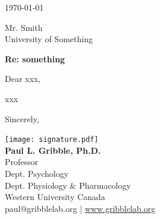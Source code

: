 \documentclass[11pt]{article}
\begin{document}
\thispagestyle{fancy}

\today
\vspace{2.0ex}

Mr. Smith\\  				%
University of Something

\vspace{2.5ex}

\textbf{Re: something}		%
\vspace{1.5ex}

Dear xxx,					%

xxx							%

\vspace{2.0ex}
Sincerely,
\vspace{2.0ex}

\texttt{[image: signature.pdf]}\vspace{1.0ex}\\
\textbf{Paul L. Gribble, Ph.D.}\\
Professor\\
Dept. Psychology\\
Dept. Physiology \& Pharmacology\\
Western University Canada\\
{\color{uwopurple}paul@gribblelab.org | \href{http://www.gribblelab.org}{www.gribblelab.org}}
\end{document}
